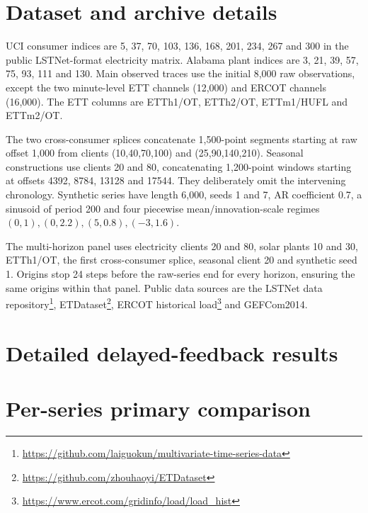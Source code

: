 \documentclass[preprint,11pt]{elsarticle}
\begin{document}
\clearpage
\appendix
\section{Dataset and archive details}\label{app:data}
UCI consumer indices are 5, 37, 70, 103, 136, 168, 201, 234, 267 and 300 in the public
LSTNet-format electricity matrix. Alabama plant indices are 3, 21, 39, 57, 75, 93, 111
and 130. Main observed traces use the initial 8,000 raw observations, except the two
minute-level ETT channels (12,000) and ERCOT channels (16,000). The ETT columns are
ETTh1/OT, ETTh2/OT, ETTm1/HUFL and ETTm2/OT.

The two cross-consumer splices concatenate 1,500-point segments starting at raw offset
1,000 from clients (10,40,70,100) and (25,90,140,210). Seasonal constructions use clients
20 and 80, concatenating 1,200-point windows starting at offsets 4392, 8784, 13128 and
17544. They deliberately omit the intervening chronology. Synthetic series have length
6,000, seeds 1 and 7, AR coefficient 0.7, a sinusoid of period 200 and four piecewise
mean/innovation-scale regimes $(0,1),(0,2.2),(5,0.8),(-3,1.6)$.

The multi-horizon panel uses electricity clients 20 and 80, solar plants 10 and 30,
ETTh1/OT, the first cross-consumer splice, seasonal client 20 and synthetic seed 1.
Origins stop 24 steps before the raw-series end for every horizon, ensuring the same
origins within that panel. Public data sources are the LSTNet data repository\footnote{\url{https://github.com/laiguokun/multivariate-time-series-data}},
ETDataset\footnote{\url{https://github.com/zhouhaoyi/ETDataset}}, ERCOT historical
load\footnote{\url{https://www.ercot.com/gridinfo/load/load_hist}} and GEFCom2014.

\clearpage
\section{Detailed delayed-feedback results}
\begin{table}[h!]\centering\small
\caption{Multi-horizon comparison. Gains use the residual--ACI score at the same horizon.
Local error is in percentage points. Tuning never uses test labels.}
\label{tab:horizon}
\end{table}

\clearpage
\section{Per-series primary comparison}
\begin{table}[h!]\centering\small
\caption{Default CQR--ACI compared with default residual--ACI, averaged over four backbones.}

\end{table}
\end{document}

